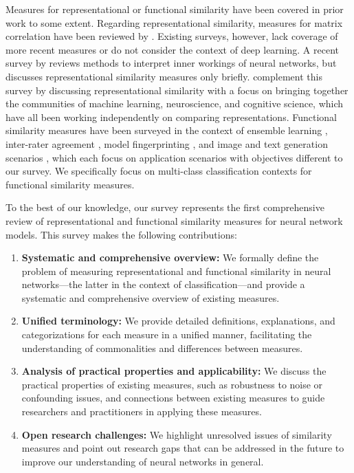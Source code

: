 \documentclass{article}
\newcommand{\citet}{\textcite}
\begin{document}
Measures for representational or functional similarity have been covered in prior work to some extent.
Regarding representational similarity, measures for matrix correlation have been reviewed by \cite{ramsay_matrix_1984, yang_survey_2021}.
Existing surveys, however, lack coverage of more recent measures or do not consider the context of deep learning.
A recent survey by \citet{rauker_toward_2022} reviews methods to interpret inner workings of neural networks, but discusses representational similarity measures only briefly.
\citet{sucholutsky_getting_2023} complement this survey by discussing representational similarity with a focus on bringing together the communities of machine learning, neuroscience, and cognitive science, which have all been working independently on comparing representations.
Functional similarity measures have been surveyed in the context of ensemble learning \cite{kuncheva_measures_2003, brown_diversity_2005}, inter-rater agreement \cite{banerjee_beyond_1999, gisev_interrater_2013,tinsley_interrater_1975}, model fingerprinting \cite{sun_deep_2023}, and image and text generation scenarios \cite{borji_pros_2018, celikyilmaz_evaluation_2021}, which each focus on application scenarios with objectives different to our survey.
We specifically focus on multi-class classification contexts for functional similarity measures.

To the best of our knowledge, our survey represents the first comprehensive review of representational and functional similarity measures for neural network models.
This survey makes the following contributions:
\begin{enumerate}
    \item \textbf{Systematic and comprehensive overview:}
    We formally define the problem of measuring representational and functional similarity in neural networks---the latter in the context of classification---and provide a systematic and comprehensive overview of existing measures.
    \item \textbf{Unified terminology:} We provide detailed definitions, explanations, and categorizations for each measure in a unified manner, facilitating the understanding of commonalities and differences between measures.
    \item \textbf{Analysis of practical properties and applicability:} We discuss the practical properties of existing measures, such as robustness to noise or confounding issues, and connections between existing measures to guide researchers and practitioners in applying these measures.
    \item \textbf{Open research challenges:} We highlight unresolved issues of similarity measures and point out research gaps that can be addressed in the future to improve our understanding of neural networks in general.
\end{enumerate}
\end{document}
